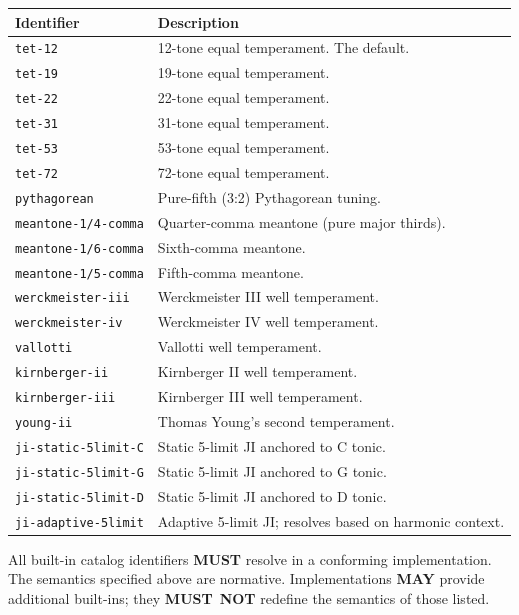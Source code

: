 \documentclass[11pt,letterpaper]{report}
\newcounter{requirement}[chapter]
\newcommand{\MUST}{\textbf{MUST}}
\newcommand{\MUSTNOT}{\textbf{MUST}\nobreak\ \textbf{NOT}}
\newcommand{\MAY}{\textbf{MAY}}
\begin{document}
\begin{longtable}{p{4cm} p{9.5cm}}
  \toprule
  \textbf{Identifier} & \textbf{Description} \\
  \midrule
  \endhead
  \texttt{tet-12} & 12-tone equal temperament. The default. \\
  \texttt{tet-19} & 19-tone equal temperament. \\
  \texttt{tet-22} & 22-tone equal temperament. \\
  \texttt{tet-31} & 31-tone equal temperament. \\
  \texttt{tet-53} & 53-tone equal temperament. \\
  \texttt{tet-72} & 72-tone equal temperament. \\
  \texttt{pythagorean} & Pure-fifth (3:2) Pythagorean tuning. \\
  \texttt{meantone-1/4-comma} & Quarter-comma meantone (pure major
  thirds). \\
  \texttt{meantone-1/6-comma} & Sixth-comma meantone. \\
  \texttt{meantone-1/5-comma} & Fifth-comma meantone. \\
  \texttt{werckmeister-iii} & Werckmeister III well temperament. \\
  \texttt{werckmeister-iv} & Werckmeister IV well temperament. \\
  \texttt{vallotti} & Vallotti well temperament. \\
  \texttt{kirnberger-ii} & Kirnberger II well temperament. \\
  \texttt{kirnberger-iii} & Kirnberger III well temperament. \\
  \texttt{young-ii} & Thomas Young's second temperament. \\
  \texttt{ji-static-5limit-C} & Static 5-limit JI anchored to C tonic. \\
  \texttt{ji-static-5limit-G} & Static 5-limit JI anchored to G tonic. \\
  \texttt{ji-static-5limit-D} & Static 5-limit JI anchored to D tonic. \\
  \texttt{ji-adaptive-5limit} & Adaptive 5-limit JI; resolves based on
  harmonic context. \\
  \bottomrule
\end{longtable}

\begin{requirement}
  \label{req:tuning:builtin-tuning-catalog}
  All built-in catalog identifiers \MUST{} resolve in a conforming
  implementation. The semantics specified above are normative.
  Implementations \MAY{} provide additional built-ins; they \MUSTNOT{}
  redefine the semantics of those listed.
\end{requirement}
\end{document}
